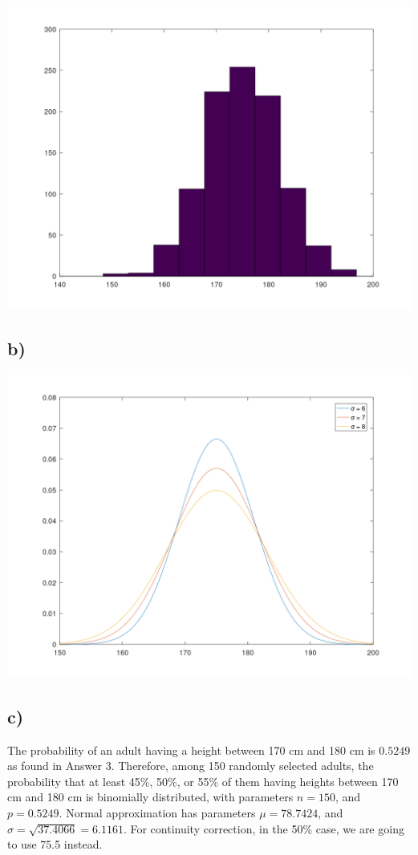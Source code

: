 \documentclass[12pt]{article}
\begin{document}
\includegraphics[width=\textwidth]{the2_hist.png}

\subsection*{b)}

\includegraphics[width=\textwidth]{the2_plot.png}

\newpage

\subsection*{c)}

The probability of an adult having a height between 170 cm and 180 cm is
$0.5249$ as found in Answer 3. Therefore, among 150 randomly selected adults,
the probability that at least 45\%, 50\%, or 55\% of them having heights between
170 cm and 180 cm is binomially distributed, with parameters $n = 150$, and $p =
0.5249$. Normal approximation has parameters $\mu = 78.7424$, and $\sigma =
\sqrt{37.4066} = 6.1161$. For continuity correction, in the 50\% case, we are
going to use 75.5 instead.
\end{document}
